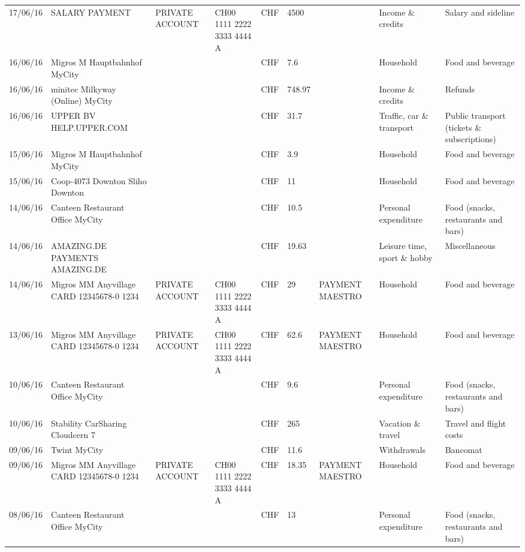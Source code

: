 \begin{landscape}
\begin{table}[t]
\begin{center}
\begin{tabular}{lllllllll}
		17/06/16 & SALARY PAYMENT & PRIVATE ACCOUNT & CH00 1111 2222 3333 4444 A & CHF   & 4500  &       & Income \& credits & Salary and sideline \\
		16/06/16 & Migros M Hauptbahnhof    MyCity &       &       & CHF   & 7.6   &       & Household & Food and beverage \\
		16/06/16 & minitec Milkyway (Online) MyCity &       &       & CHF   & 748.97 &       & Income \& credits & Refunds \\
		16/06/16 & UPPER BV                  HELP.UPPER.COM &       &       & CHF   & 31.7  &       & Traffic, car \& transport & Public transport (tickets \& subscriptions) \\
		15/06/16 & Migros M Hauptbahnhof    MyCity &       &       & CHF   & 3.9   &       & Household & Food and beverage \\
		15/06/16 & Coop-4073 Downton Sliho   Downton &       &       & CHF   & 11    &       & Household & Food and beverage \\
		14/06/16 & Canteen Restaurant Office      MyCity &       &       & CHF   & 10.5  &       & Personal expenditure & Food (snacks, restaurants and bars) \\
		14/06/16 & AMAZING.DE PAYMENTS       AMAZING.DE &       &       & CHF   & 19.63 &       & Leisure time, sport \& hobby & Miscellaneous \\
		14/06/16 & Migros MM Anyvillage CARD 12345678-0 1234 & PRIVATE ACCOUNT & CH00 1111 2222 3333 4444 A & CHF   & 29    & PAYMENT MAESTRO & Household & Food and beverage \\
		13/06/16 & Migros MM Anyvillage CARD 12345678-0 1234 & PRIVATE ACCOUNT & CH00 1111 2222 3333 4444 A & CHF   & 62.6  & PAYMENT MAESTRO & Household & Food and beverage \\
		10/06/16 & Canteen Restaurant Office      MyCity &       &       & CHF   & 9.6   &       & Personal expenditure & Food (snacks, restaurants and bars) \\
		10/06/16 & Stability CarSharing      Cloudcern 7 &       &       & CHF   & 265   &       & Vacation \& travel & Travel and flight costs \\
		09/06/16 & Twint               MyCity &       &       & CHF   & 11.6  &       & Withdrawals & Bancomat \\
		09/06/16 & Migros MM Anyvillage CARD 12345678-0 1234 & PRIVATE ACCOUNT & CH00 1111 2222 3333 4444 A & CHF   & 18.35 & PAYMENT MAESTRO & Household & Food and beverage \\
		08/06/16 & Canteen Restaurant Office      MyCity &       &       & CHF   & 13    &       & Personal expenditure & Food (snacks, restaurants and bars) \\

\end{tabular}
\end{center}
\end{table}
\end{landscape}
